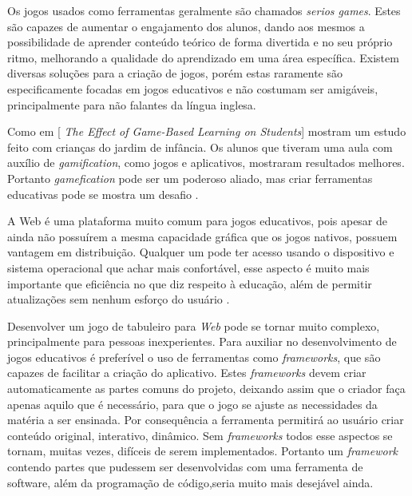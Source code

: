 Os jogos usados como ferramentas geralmente são chamados \textit{serios games}. Estes são capazes de aumentar o engajamento dos alunos, dando aos mesmos a possibilidade de aprender conteúdo teórico de forma divertida e no seu próprio ritmo, melhorando a qualidade do aprendizado em uma área específica. Existem diversas soluções para a criação de jogos, porém estas raramente são especificamente focadas em jogos educativos e não costumam ser amigáveis, principalmente para não falantes da língua inglesa.

Como \cite{liu2013effect} em [\textit{ The Effect of Game-Based Learning on Students}] mostram um estudo feito com crianças do jardim de infância. Os alunos que tiveram uma aula com auxílio de \textit{gamification}, como jogos e aplicativos, mostraram resultados melhores. Portanto \textit{gamefication} pode ser um poderoso aliado, mas criar ferramentas educativas pode se mostra um desafio \cite{liu2013effect}.

A Web é uma plataforma muito comum para jogos educativos, pois apesar de ainda não possuírem a
mesma capacidade gráfica que os jogos nativos, possuem vantagem em distribuição. Qualquer um
pode ter acesso usando o dispositivo e sistema operacional que achar mais confortável, esse 
aspecto é muito mais importante que eficiência no que diz respeito à educação, além de permitir
atualizações sem nenhum esforço do usuário \cite{Mills:19}.

Desenvolver um jogo de tabuleiro para \textit{Web} pode se tornar muito complexo, principalmente para pessoas inexperientes. Para auxiliar no desenvolvimento de jogos educativos é preferível o uso de ferramentas como \textit{frameworks}, que são capazes de facilitar a criação do aplicativo. Estes \textit{frameworks} devem criar automaticamente as partes comuns do projeto, deixando assim que o criador faça apenas aquilo que é necessário, para que o jogo se ajuste as necessidades da matéria a ser ensinada. Por consequência a ferramenta permitirá ao usuário criar conteúdo original, interativo, dinâmico. Sem \textit{frameworks} todos esse aspectos se tornam, muitas vezes, difíceis de serem implementados. Portanto um \textit{framework} contendo partes que pudessem ser desenvolvidas com uma ferramenta de software, além da programação de código,seria muito mais desejável ainda.


